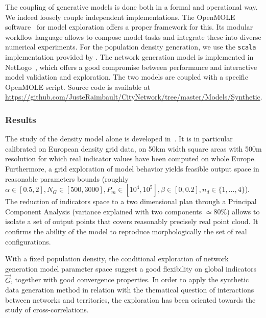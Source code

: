 \documentclass{bmcart}
\begin{document}
The coupling of generative models is done both in a formal and operational way. We indeed loosely couple independent implementations. The OpenMOLE software~\cite{reuillon2013openmole} for model exploration offers a proper framework for this. Its modular workflow language allows to compose model tasks and integrate these into diverse numerical experiments. For the population density generation, we use the \texttt{scala} implementation provided by \cite{raimbault2018calibration}. The network generation model is implemented in NetLogo~\cite{wilensky1999netlogo}, which offers a good compromise between performance and interactive model validation and exploration. The two models are coupled with a specific OpenMOLE script. Source code is available at \url{https://github.com/JusteRaimbault/CityNetwork/tree/master/Models/Synthetic}.





\subsubsection*{Results}

The study of the density model alone is developed in~\cite{raimbault2018calibration}. It is in particular calibrated on European density grid data, on 50km width square areas with 500m resolution for which real indicator values have been computed on whole Europe. Furthermore, a grid exploration of model behavior yields feasible output space in reasonable parameters bounds (roughly $\alpha \in [0.5,2],N_G\in [500,3000], P_m \in [10^4,10^5],\beta\in [0,0.2], n_d \in \{ 1, \ldots , 4\}$). The reduction of indicators space to a two dimensional plan through a Principal Component Analysis (variance explained with two components $\simeq 80\%$) allows to isolate a set of output points that covers reasonably precisely real point cloud. It confirms the ability of the model to reproduce morphologically the set of real configurations.



With a fixed population density, the conditional exploration of network generation model parameter space suggest a good flexibility on global indicators $\vec{G}$, together with good convergence properties. In order to apply the synthetic data generation method in relation with the thematical question of interactions between networks and territories, the exploration has been oriented towards the study of cross-correlations.
\end{document}
